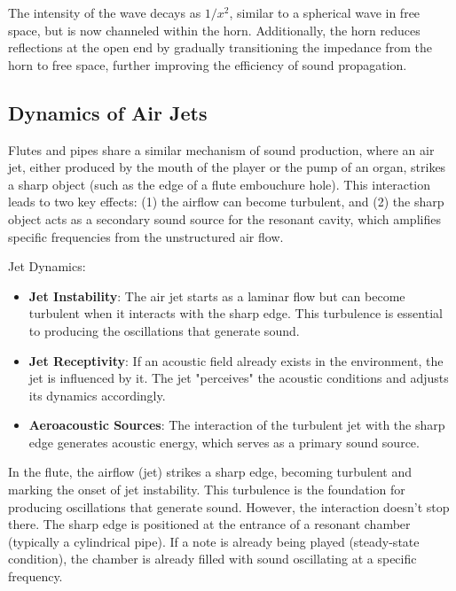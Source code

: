 \documentclass[a4paper]{article}
\begin{document}
The intensity of the wave decays as \( 1/x^2 \), similar to a spherical wave in free space, but is now channeled within the horn. Additionally, the horn reduces reflections at the open end by gradually transitioning the impedance from the horn to free space, further improving the efficiency of sound propagation.

\subsection{Dynamics of Air Jets}


Flutes and pipes share a similar mechanism of sound production, where an air jet, either produced by the mouth of the player or the pump of an organ, strikes a sharp object (such as the edge of a flute embouchure hole). This interaction leads to two key effects: (1) the airflow can become turbulent, and (2) the sharp object acts as a secondary sound source for the resonant cavity, which amplifies specific frequencies from the unstructured air flow.

Jet Dynamics:
\begin{itemize}


\item \textbf{Jet Instability}:
   The air jet starts as a laminar flow but can become turbulent when it interacts with the sharp edge. This turbulence is essential to producing the oscillations that generate sound.

\item \textbf{Jet Receptivity}:  
   If an acoustic field already exists in the environment, the jet is influenced by it. The jet "perceives" the acoustic conditions and adjusts its dynamics accordingly.

\item \textbf{Aeroacoustic Sources}: 
   The interaction of the turbulent jet with the sharp edge generates acoustic energy, which serves as a primary sound source.

\end{itemize}




In the flute, the airflow (jet) strikes a sharp edge, becoming turbulent and marking the onset of jet instability. This turbulence is the foundation for producing oscillations that generate sound. However, the interaction doesn’t stop there. The sharp edge is positioned at the entrance of a resonant chamber (typically a cylindrical pipe). If a note is already being played (steady-state condition), the chamber is already filled with sound oscillating at a specific frequency.
\end{document}
